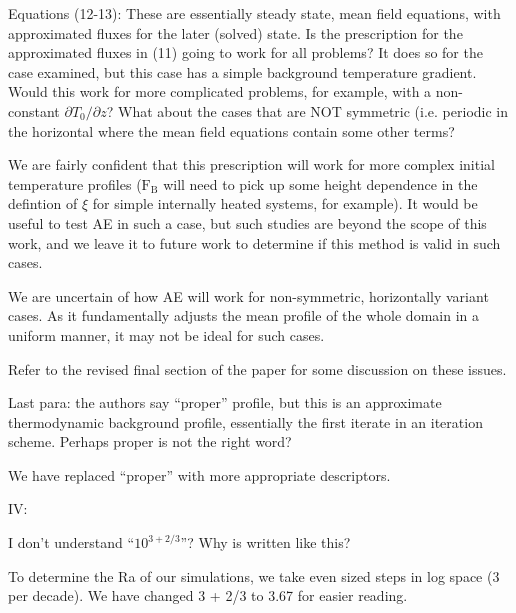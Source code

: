 \documentclass[aps, 11pt, singlecolumn]{revtex4-1} %
\begin{document}
\begin{singlespace}
\begin{myquotation}
Equations (12-13): These are essentially steady state, mean field
equations, with approximated fluxes for the later (solved) state. Is
the prescription for the approximated fluxes in (11) going to work for
all problems? It does so for the case examined, but this case has a
simple background temperature gradient. Would this work for more
complicated problems, for example, with a non-constant $\partial T_0/\partial z$? What
about the cases that are NOT symmetric (i.e. periodic in the
horizontal where the mean field equations contain some other terms?
\end{myquotation}
We are fairly confident that this prescription will work for more complex
initial temperature profiles ($\text{F}_{\text{B}}$ will need to pick up some
height dependence in the defintion of $\xi$ for simple internally heated
systems, for example). It would be useful to test AE in such a case, but such
studies are beyond the scope of this work, and we leave it to future work
to determine if this method is valid in such cases.   

We are uncertain of 
how AE will work for non-symmetric, horizontally variant cases. As it fundamentally
adjusts the mean profile of the whole domain in a uniform manner, it may not be
ideal for such cases. 

Refer to the revised final section of the paper for some discussion on these
issues.

\begin{myquotation}
Last para: the authors say “proper” profile, but this is an
approximate thermodynamic background profile, essentially the first
iterate in an iteration scheme. Perhaps proper is not the right word?
\end{myquotation}
We have replaced ``proper'' with more appropriate descriptors.

\begin{myquotation}
IV:

I don’t understand ``$10^{3+2/3}$''? Why is written like this?
\end{myquotation}
To determine the Ra of our simulations, we take even sized steps in log space
(3 per decade). We have changed 3 + 2/3 to 3.67 for easier reading.



\end{singlespace}
\end{document}
